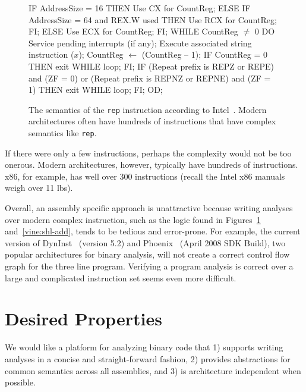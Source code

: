 \begin{figure}
\begin{footnotesize}
\begin{code}
  IF AddressSize = 16 
  THEN 
     Use CX for CountReg; 
  ELSE IF AddressSize = 64 and REX.W used 
     THEN Use RCX for CountReg; FI; 
  ELSE 
     Use ECX for CountReg; 
  FI; 
  WHILE CountReg $\neq$ 0 
  DO 
      Service pending interrupts (if any); 
      Execute associated string instruction ($x$);  
      CountReg $\leftarrow$ (CountReg – 1); 
      IF CountReg = 0 
      THEN exit WHILE loop; FI; 
      IF (Repeat prefix is REPZ or REPE) and (ZF = 0) 
         or (Repeat prefix is REPNZ or REPNE) and (ZF = 1) 
      THEN exit WHILE loop; FI; 
  OD; 
\end{code}
\end{footnotesize}
\caption{The semantics of the {\tt rep} instruction according to
  Intel~\cite{intel:x86}. Modern architectures often have hundreds of
  instructions that have complex semantics like {\tt rep}.}
\label{vine:rep}
\end{figure}

If there were only a few instructions, perhaps the complexity would
not be too onerous.  Modern architectures, however, typically have
hundreds of instructions. x86, for example, has well over 300
instructions (recall the Intel x86 manuals~\cite{intel:x86} weigh over
11 lbs).


Overall, an assembly specific approach is unattractive because writing
analyses over modern complex instruction, such as the logic found in
Figures~\ref{vine:rep} and~\ref{vine:shl-add}, tends to be tedious and
error-prone. For example, the current version of
DynInst~\cite{dyninst} (version 5.2) and Phoenix~\cite{phoenix} (April
2008 SDK Build), two popular architectures for binary analysis, will not
create a correct control flow graph for the three line program.
Verifying a program analysis is correct over a large and
complicated instruction set seems even more difficult. %


\section{Desired Properties}

We would like a platform for analyzing binary code that 1) supports
writing analyses in a concise and straight-forward fashion, 2)
provides abstractions for common semantics across all assemblies, and
3) is architecture independent when possible.

